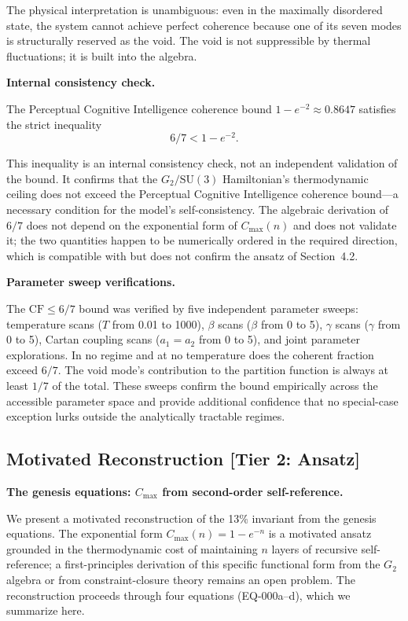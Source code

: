 \documentclass[12pt,a4paper]{article}
\begin{document}
The physical interpretation is unambiguous: even in the maximally disordered state, the system cannot achieve perfect coherence because one of its seven modes is structurally reserved as the void. The void is not suppressible by thermal fluctuations; it is built into the algebra.

\textbf{Internal consistency check.}

The Perceptual Cognitive Intelligence coherence bound $1 - e^{-2} \approx 0.8647$ satisfies the strict inequality
\[
6/7 < 1 - e^{-2}.
\]

This inequality is an internal consistency check, not an independent validation of the bound. It confirms that the $G_2/\mathrm{SU}(3)$ Hamiltonian's thermodynamic ceiling does not exceed the Perceptual Cognitive Intelligence coherence bound---a necessary condition for the model's self-consistency. The algebraic derivation of $6/7$ does not depend on the exponential form of $C_{\max}(n)$ and does not validate it; the two quantities happen to be numerically ordered in the required direction, which is compatible with but does not confirm the ansatz of Section~4.2.

\textbf{Parameter sweep verifications.}

The $\mathrm{CF} \leq 6/7$ bound was verified by five independent parameter sweeps: temperature scans ($T$ from 0.01 to 1000), $\beta$ scans ($\beta$ from 0 to 5), $\gamma$ scans ($\gamma$ from 0 to 5), Cartan coupling scans ($a_1 = a_2$ from 0 to 5), and joint parameter explorations. In no regime and at no temperature does the coherent fraction exceed $6/7$. The void mode's contribution to the partition function is always at least $1/7$ of the total. These sweeps confirm the bound empirically across the accessible parameter space and provide additional confidence that no special-case exception lurks outside the analytically tractable regimes.

\subsection{Motivated Reconstruction [Tier 2: Ansatz]}

\textbf{The genesis equations: $C_{\max}$ from second-order self-reference.}

We present a motivated reconstruction of the 13\% invariant from the genesis equations. The exponential form $C_{\max}(n) = 1 - e^{-n}$ is a motivated ansatz grounded in the thermodynamic cost of maintaining $n$ layers of recursive self-reference; a first-principles derivation of this specific functional form from the $G_2$ algebra or from constraint-closure theory remains an open problem. The reconstruction proceeds through four equations (EQ-000a--d), which we summarize here.
\end{document}

